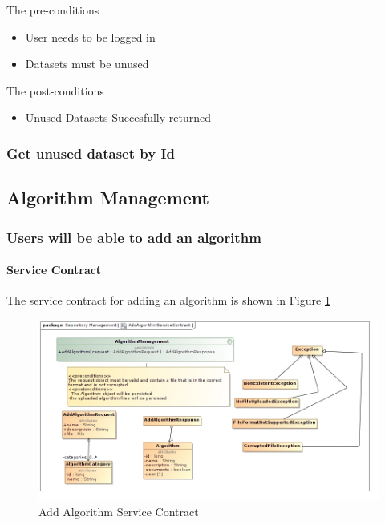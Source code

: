 The pre-conditions
\begin{itemize}
  \item User needs to be logged in
  \item Datasets must be unused
\end{itemize}

The post-conditions
\begin{itemize}
  \item Unused Datasets Succesfully returned
\end{itemize}
\subsubsection {Get unused dataset by Id}

\subsection{Algorithm Management}
\subsubsection {Users will be able to add an algorithm}
\paragraph{Service Contract}
The service contract for adding an algorithm is shown in Figure \ref{fig:addAlgorithmService}

\begin{figure}[H]
  \begin{center}
  \includegraphics[scale=0.5]{../Diagrams and Charts/Test Data/AddAlgorithmServiceContract.jpg}
  \caption{Add Algorithm Service Contract}
  \label{fig:addAlgorithmService}
  \end{center}  
 \end{figure}

